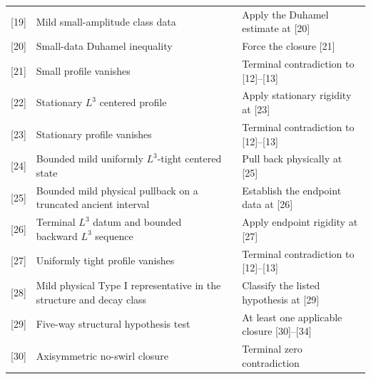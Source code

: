 \documentclass[11pt]{amsart}
\theoremstyle{plain}
\theoremstyle{definition}
\theoremstyle{remark}
\numberwithin{equation}{section}
\begin{document}
\begin{landscape}
\begin{longtable}{@{}C{0.72cm}L{4.55cm}L{7.25cm}L{6.05cm}@{}}
[19] & Mild small-amplitude class data &
 & Apply the Duhamel estimate at [20] \\

[20] & Small-data Duhamel inequality &
 & Force the closure [21] \\

[21] & Small profile vanishes &
 & Terminal contradiction to [12]--[13] \\

[22] & Stationary \(L^3\) centered profile &
 & Apply stationary rigidity at [23] \\

[23] & Stationary profile vanishes &
 & Terminal contradiction to [12]--[13] \\

[24] & Bounded mild uniformly \(L^3\)-tight centered state &
 & Pull back physically at [25] \\

[25] & Bounded mild physical pullback on a truncated ancient interval &
 & Establish the endpoint data at [26] \\

[26] & Terminal \(L^3\) datum and bounded backward \(L^3\) sequence &
 & Apply endpoint rigidity at [27] \\

[27] & Uniformly tight profile vanishes &
 & Terminal contradiction to [12]--[13] \\

[28] & Mild physical Type I representative in the structure and decay class &
 & Classify the listed hypothesis at [29] \\

[29] & Five-way structural hypothesis test &
 & At least one applicable closure [30]--[34] \\

[30] & Axisymmetric no-swirl closure &
 & Terminal zero contradiction \\


\end{longtable}
\end{landscape}
\end{document}
